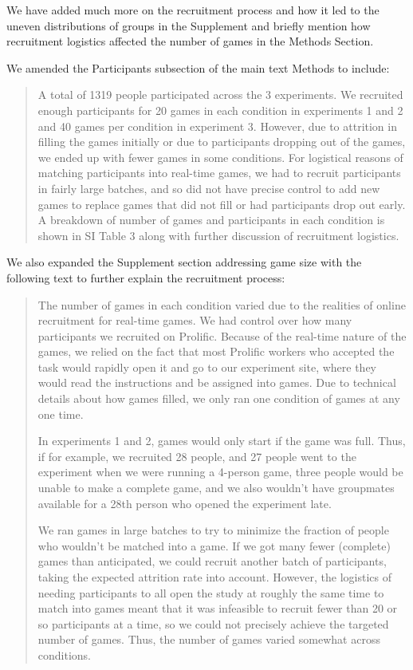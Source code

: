 \documentclass{stanfordletter}
\newcommand{\revised}[1]{\begin{quote}	#1 \end{quote}}
\begin{document}
\begin{letter}{}
          We have added much more on the recruitment process and how it led to the uneven distributions of groups in the Supplement and briefly mention how recruitment logistics affected the number of games in the Methods Section. 
          
          We amended the Participants subsection of the main text Methods to include:
          
          \revised{A total of 1319 people participated across the 3 experiments. We recruited enough participants for 20 games in each condition in experiments 1 and 2 and 40 games per condition in experiment 3. However, due to attrition in filling the games initially or due to participants dropping out of the games, we ended up with fewer games in some conditions. For logistical reasons of matching participants into real-time games, we had to recruit participants in fairly large batches, and so did not have precise control to add new games to replace games that did not fill or had participants drop out early.  A breakdown of number of games and participants in each condition is shown in SI Table 3 along with further discussion of recruitment logistics. }
          
          We also expanded the Supplement section addressing game size with the following text to further explain the recruitment process:
          
          \revised{The number of games in each condition varied due to the realities of online recruitment for real-time games. We had control over how many participants we recruited on Prolific. Because of the real-time nature of the games, we relied on the fact that most Prolific workers who accepted the task would rapidly open it and go to our experiment site, where they would read the instructions and be assigned into games. Due to technical details about how games filled, we only ran one condition of games at any one time.
          	
          	In experiments 1 and 2, games would only start if the game was full. Thus, if for example, we recruited 28 people, and 27 people went to the experiment when we were running a 4-person game, three people would be unable to make a complete game, and we also wouldn't have groupmates available for a 28th person who opened the experiment late. 
          	
          	We ran games in large batches to try to minimize the fraction of people who wouldn't be matched into a game. If we got many fewer (complete) games than anticipated, we could recruit another batch of participants, taking the expected attrition rate into account. However, the logistics of needing participants to all open the study at roughly the same time to match into games meant that it was infeasible to recruit fewer than 20 or so participants at a time, so we could not precisely achieve the targeted number of games. Thus, the number of games varied somewhat across conditions. 
          	
}
\end{letter}
\end{document}
